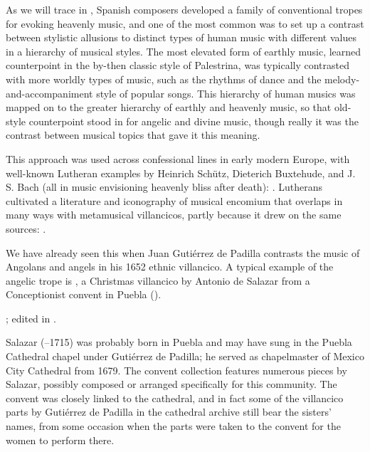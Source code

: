 As we will trace in , Spanish composers developed a
family of conventional tropes for evoking heavenly music, and one of the most
common was to set up a contrast between stylistic allusions to distinct types
of human music with different values in a hierarchy of musical styles.
The most elevated form of earthly music, learned counterpoint in the by-then
classic style of Palestrina, was typically contrasted with more worldly types
of music, such as the rhythms of dance and the melody-and-accompaniment style
of popular songs.
This hierarchy of human musics was mapped on to the greater hierarchy of
earthly and heavenly music, so that old-style counterpoint stood in for
angelic and divine music, though really it was the contrast between musical
topics that gave it this meaning.%
\begin{Footnote}
    This approach was used across confessional lines in early modern Europe,
    with well-known Lutheran examples by Heinrich Schütz, Dieterich Buxtehude,
    and J. S. Bach (all in music envisioning heavenly bliss after death):
    \autocites
    {Johnston:Rhetorical}
    {Yearsley:Buxtehude}
    {Yearsley:BachCounterpoint}.
    Lutherans cultivated a literature and iconography of musical encomium that
    overlaps in many ways with metamusical villancicos, partly because it drew
    on the same sources:
    \autocite{Schmidt:Lob_der_Musik}.
\end{Footnote}
We have already seen this when Juan Gutiérrez de Padilla contrasts the music of
Angolans and angels in his 1652 ethnic villancico.
A typical example of the angelic trope is , a Christmas villancico by Antonio de Salazar from a Conceptionist
convent in Puebla ().%
\begin{Footnote} 
    ; edited in \autocite{Cashner:WLSCM32}.  
\end{Footnote}
Salazar (--1715) was probably born in Puebla and may have sung in
the Puebla Cathedral chapel under Gutiérrez de Padilla; he served as
chapelmaster of Mexico City Cathedral from 1679.%
    \Autocite{Koegel:Salazar} 
The convent collection features numerous pieces by Salazar, possibly composed
or arranged specifically for this community.
The convent was closely linked to the cathedral, and in fact some of the
villancico parts by Gutiérrez de Padilla in the cathedral archive still bear
the sisters' names, from some occasion when the parts were taken to the convent
for the women to perform there.%
    \Autocites
    {Favila:Profession}
    {Tello:SanchezGarzaCatalogo}


